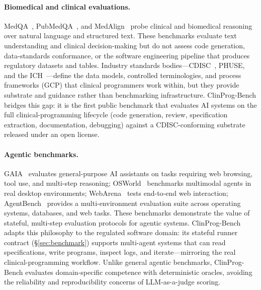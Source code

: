 \paragraph{Biomedical and clinical evaluations.}
MedQA~\citep{jin2021medqa}, PubMedQA~\citep{jin2019pubmedqa}, and
MedAlign~\citep{fleming2024medalign} probe clinical and biomedical reasoning
over natural language and structured text.
These benchmarks evaluate text understanding and clinical decision-making but
do not assess code generation, data-standards conformance, or the software
engineering pipeline that produces regulatory datasets and tables.
Industry standards bodies---CDISC~\citep{cdisc_sdtm_ig,cdisc_adam_ig}, PHUSE,
and the ICH~\citep{ich_e6}---define the data models, controlled terminologies,
and process frameworks (GCP) that clinical programmers work within, but they
provide substrate and guidance rather than benchmarking infrastructure.
ClinProg-Bench bridges this gap: it is the first public benchmark that
evaluates AI systems on the full clinical-programming lifecycle (code
generation, review, specification extraction, documentation, debugging)
against a CDISC-conforming substrate released under an open license.

\paragraph{Agentic benchmarks.}
GAIA~\citep{mialon2023gaia} evaluates general-purpose AI assistants on tasks
requiring web browsing, tool use, and multi-step reasoning;
OSWorld~\citep{xie2024osworld} benchmarks multimodal agents in real desktop
environments; WebArena~\citep{webarena2023} tests end-to-end web interaction;
AgentBench~\citep{agentbench2023} provides a multi-environment evaluation
suite across operating systems, databases, and web tasks.
These benchmarks demonstrate the value of stateful, multi-step evaluation
protocols for agentic systems.
ClinProg-Bench adapts this philosophy to the regulated software domain: its
stateful runner contract (\S\ref{sec:benchmark}) supports multi-agent systems
that can read specifications, write programs, inspect logs, and
iterate---mirroring the real clinical-programming workflow.
Unlike general agentic benchmarks, ClinProg-Bench evaluates domain-specific
competence with deterministic oracles, avoiding the reliability and
reproducibility concerns of LLM-as-a-judge scoring.

